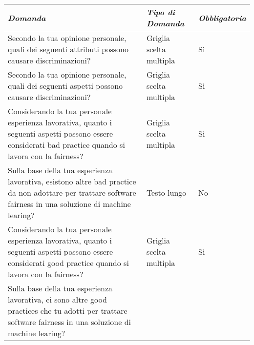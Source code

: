    \begin{longtable}{| p{} | p{} | p{} |} 
        \hline\textbf{\textit{Domanda}} & \textbf{\textit{Tipo di Domanda}} & \textbf{\textit{Obbligatoria}}\\
        \hline
        \endhead 
        
        \rowcolor{Gray}
        
       Secondo la tua opinione personale, quali dei seguenti attributi possono causare discriminazioni?  
        
        &  Griglia scelta multipla
        
        & Sì
        
        \\ \hline
        
         Secondo la tua opinione personale, quali dei seguenti aspetti possono causare discriminazioni? 
        
        & Griglia scelta multipla
        
        & Sì
        
        
        
        
        \\ \hline
        \rowcolor{Gray}
       Considerando la tua personale esperienza lavorativa, quanto i seguenti aspetti possono essere considerati bad practice quando si lavora con la fairness?        
        
        &  Griglia scelta multipla
        
        & Sì
        
        \\ 
        \hline 
       Sulla base della tua esperienza lavorativa, esistono altre bad practice da non adottare per trattare software fairness in  una soluzione di machine learing?
        
        & Testo lungo
        
        & No
        
           \\ \hline
        \rowcolor{Gray}
       Considerando la tua personale esperienza lavorativa, quanto i seguenti aspetti possono essere considerati good practice quando si lavora con la fairness?        
        
        &  Griglia scelta multipla
        
        & Sì
        
        \\ 
        \hline 
       Sulla base della tua esperienza lavorativa, ci sono altre good practices che tu adotti per trattare software fairness in  una soluzione di machine learing?
        

\end{longtable}
